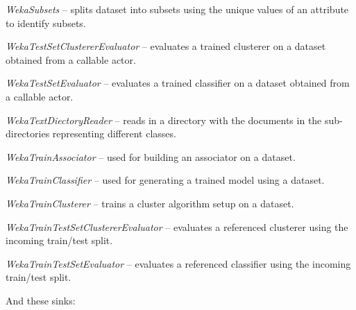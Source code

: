 \begin{tight_itemize}
	\item \textit{WekaSubsets} -- splits dataset into subsets using the unique
	values of an attribute to identify subsets.
	\item \textit{WekaTestSetClustererEvaluator} -- evaluates a trained
	clusterer on a dataset obtained from a callable actor.
	\item \textit{WekaTestSetEvaluator} -- evaluates a trained classifier on
	a dataset obtained from a callable actor.
	\item \textit{WekaTextDiectoryReader} -- reads in a directory with the 
	documents in the sub-directories representing different classes.
	\item \textit{WekaTrainAssociator} -- used for building an associator
	on a dataset.
	\item \textit{WekaTrainClassifier} -- used for generating a trained
	model using a dataset.
	\item \textit{WekaTrainClusterer} -- trains a cluster algorithm setup
	on a dataset.
	\item \textit{WekaTrainTestSetClustererEvaluator} -- evaluates a referenced
	clusterer using the incoming train/test split.
	\item \textit{WekaTrainTestSetEvaluator} -- evaluates a referenced classifier
	using the incoming train/test split.
\end{tight_itemize}
And these sinks:
